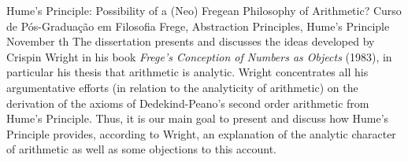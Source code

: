 \documentclass[diss]{UFRuralRJ}
\begin{document}

\begin{englishabstract}
{Hume's Principle: Possibility of a (Neo) Fregean Philosophy of Arithmetic?} %
{Curso de Pós-Graduação em Filosofia} %
{Frege, Abstraction Principles, Hume's Principle} %
{November} %
{th} %
The dissertation presents and discusses the ideas developed by Crispin Wright in his book \textit{Frege's Conception of Numbers as Objects} (1983), in particular his thesis that arithmetic is analytic. Wright concentrates all his argumentative efforts (in relation to the analyticity of arithmetic) on the derivation of the axioms of Dedekind-Peano's second order arithmetic from Hume's Principle. Thus, it is our main goal to present and discuss how Hume's Principle provides, according to Wright, an explanation of the analytic character of arithmetic as well as some objections to this account.
\end{englishabstract}




\end{document}
